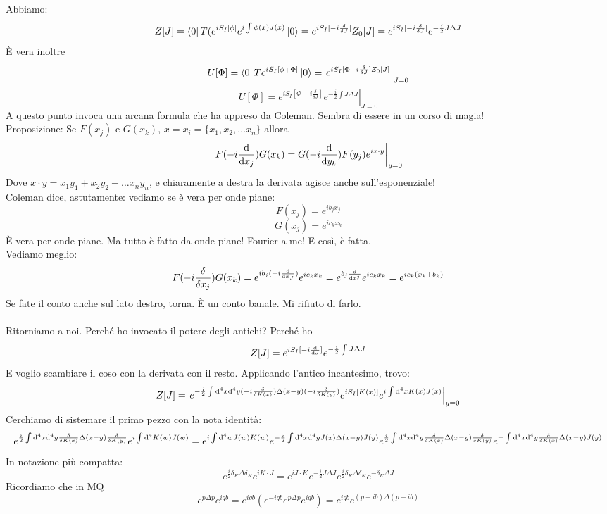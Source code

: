 \documentclass[a4paper, 11pt]{article}
\begin{document}
	Abbiamo:
	\[Z[J] = \left\langle 0\right|T(e^{iS_I[\phi]}e^{i\int{\phi(x)J(x)}}\left| 0\right\rangle = e^{iS_I[-i\frac{\delta}{\delta J}]} Z_0[J] = e^{iS_I[-i\frac{\delta}{\delta J}]} e^{-\frac{i}{2}J\Delta J}\]
	È vera inoltre
	\[U[\Phi]=\left\langle 0\right|Te^{i S_I [\phi+\Phi]}\left| 0\right\rangle = \left. e^{iS_I[\Phi - i\frac{\delta}{\delta J}]Z_0[J]} \right|_{J=0}\]
	\[U[\Phi]= \left. e^{iS_I[\Phi-i\frac{\delta}{\delta J}]} e^{-\frac{i}{2}\int J\Delta J} \right|_{J=0}\]
	A questo punto invoca una arcana formula che ha appreso da Coleman. Sembra di essere in un corso di magia!\\
	Proposizione: Se $F(x_j)$ e $G(x_k)$, $x = x_i = \{x_1,x_2,\dots x_n\}$ allora
	\[\left. F(-i\frac{\mathrm{d}}{\mathrm{d} x_j})G(x_k) = G(-i\frac{\mathrm{d}}{\mathrm{d} y_k}) F(y_j) e^{ix\cdot y} \right|_{y=0}\]
	Dove $x\cdot y = x_1 y_1 + x_2 y_2 + \dots x_n y_n$, e chiaramente a destra la derivata agisce anche sull'esponenziale!\\
	Coleman dice, astutamente: vediamo se è vera per onde piane:
	\[F(x_j)=e^{ib_j x_j}\]
	\[G(x_j)=e^{ic_k x_k}\]
	È vera per onde piane. Ma tutto è fatto da onde piane! Fourier a me! E così, è fatta.\\
	Vediamo meglio:
	\[F(-i\frac{\delta}{\delta x_j})G(x_k) = e^{ib_j (-i\frac{\mathrm{d}}{\mathrm{d} x_J})} e^{ic_k x_k} = e^{b_j \frac{\mathrm{d}}{\mathrm{d} x^j}} e^{ic_k x_k} = e^{ic_k (x_k + b_k)}\]
	Se fate il conto anche sul lato destro, torna. È un conto banale. Mi rifiuto di farlo.\\
	\\
	\noindent Ritorniamo a noi. Perché ho invocato il potere degli antichi? Perché ho
	\[Z[J] = e^{iS_I[-i\frac{\mathrm{d}}{\mathrm{d} J}]}e^{-\frac{i}{2}\int J\Delta J}\]
	E voglio scambiare il coso con la derivata con il resto. Applicando l'antico incantesimo, trovo:
	\[Z[J] = \left. e^{-\frac{i}{2} \int \mathrm{d}^4x \mathrm{d}^4y (-i\frac{\delta}{\delta K(x)}) \Delta(x-y) (-i\frac{\delta}{\delta K(y)})} e^{iS_I[K(x)]}e^{i\int \mathrm{d}^4x K(x)J(x)}\right|_{y=0}\]
	Cerchiamo di sistemare il primo pezzo con la nota identità:
	\[e^{\frac{i}{2}\int \mathrm{d}^4x \mathrm{d}^4y \frac{\delta}{\delta K(x)} \Delta(x-y) \frac{\delta}{\delta K(y)}} e^{i\int \mathrm{d}^4 K(w)J(w)} = e^{i\int \mathrm{d}^4w J(w)K(w)} e^{-\frac{i}{2}\int \mathrm{d}^4x \mathrm{d}^4y J(x)\Delta(x-y)J(y)} e^{\frac{i}{2}\int \mathrm{d}^4x \mathrm{d}^4y \frac{\delta}{\delta K(x)} \Delta(x-y) \frac{\delta}{\delta K(y)}} e^{-\int \mathrm{d}^4x \mathrm{d}^4y \frac{\delta}{\delta K(x)} \Delta(x-y) J(y)}\]
	In notazione più compatta:
	\[e^{\frac{i}{2} \delta_K \Delta \delta_K} e^{iK \cdot J} = e^{iJ \cdot K}e^{-\frac{i}{2}J\Delta J}e^{\frac{i}{2}\delta_K \Delta \delta_K} e^{-\delta_K \Delta J}\]
	Ricordiamo che in MQ
	\[e^{p\Delta p}e^{iqb} = e^{iqb} (e^{-iqb}e^{p\Delta p}e^{iqb}) = e^{iqb} e^{(p-ib)\Delta(p+ib)} \]
\end{document}
